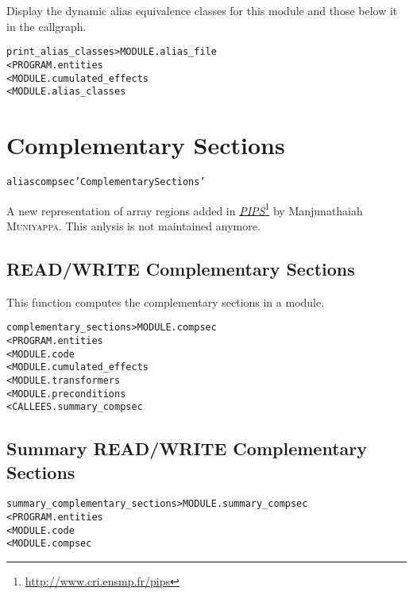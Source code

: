 \documentclass[a4paper]{report}
\newenvironment{PipsMake}{\begin{alltt}}{\end{alltt}}
\newcommand{\LINK}[2]{\href{#2}{#1}\footnote{\url{#2}}\xspace}
\newcommand{\PIPS}{\LINK{\emph{PIPS}}{http://www.cri.ensmp.fr/pips}}
\begin{document}
Display the dynamic alias equivalence classes for this module and those
below it in the callgraph.
\begin{PipsMake}
print_alias_classes > MODULE.alias_file
        < PROGRAM.entities
        < MODULE.cumulated_effects
        < MODULE.alias_classes
\end{PipsMake}


\section{Complementary Sections}
\label{subsection-complementary-sections}

\begin{PipsMake}
alias compsec 'Complementary Sections'
\end{PipsMake}

A new representation of array regions added in \PIPS{} by
Manjunathaiah \textsc{Muniyappa}. This anlysis is not maintained
anymore.



\subsection{READ/WRITE Complementary Sections}
\label{subsubsection-complementary-sections}

This function computes the complementary sections in a module.
\begin{PipsMake}
complementary_sections > MODULE.compsec
        < PROGRAM.entities
        < MODULE.code
        < MODULE.cumulated_effects
        < MODULE.transformers
        < MODULE.preconditions     
        < CALLEES.summary_compsec
\end{PipsMake}

\subsection{Summary READ/WRITE Complementary Sections}
\label{subsubsection-summary-complementary-sections}


\begin{PipsMake}
summary_complementary_sections > MODULE.summary_compsec
        < PROGRAM.entities
        < MODULE.code
        < MODULE.compsec  
\end{PipsMake}
\end{document}
